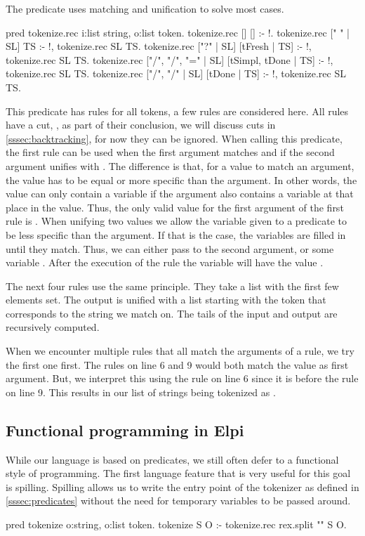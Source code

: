 \documentclass[thesis.tex]{subfiles}
\begin{document}
{{The predicate  uses matching and unification to solve most cases.
\begin{elpicode}
  pred tokenize.rec i:list string, o:list token.
  tokenize.rec [] [] :- !.
  tokenize.rec [" " | SL] TS :- !, tokenize.rec SL TS.
  tokenize.rec ["?" | SL] [tFresh | TS] :- !, 
    tokenize.rec SL TS.
  tokenize.rec ["/", "/", "=" | SL] 
               [tSimpl, tDone | TS] :- !, 
    tokenize.rec SL TS.
  tokenize.rec ["/", "/" | SL] [tDone | TS] :- !, 
    tokenize.rec SL TS.
\end{elpicode}
This predicate has rules for all tokens, a few rules are considered here. All rules have a cut, \elpii{!}, as part of their conclusion, we will discuss cuts in \cref{sssec:backtracking}, for now they can be ignored. When calling this predicate, the first rule can be used when the first argument matches \elpii{[]} and if the second argument unifies with \elpii{[]}. The difference is that, for a value to match an argument, the value has to be equal or more specific than the argument. In other words, the value can only contain a variable if the argument also contains a variable at that place in the value. Thus, the only valid value for the first argument of the first rule is \elpii{[]}. When unifying two values we allow the variable given to a predicate to be less specific than the argument. If that is the case, the variables are filled in until they match. Thus, we can either pass \elpii{[]} to the second argument, or some variable . After the execution of the rule the variable  will have the value \elpii{[]}.

The next four rules use the same principle. They take a list with the first few elements set. The output is unified with a list starting with the token that corresponds to the string we match on. The tails of the input and output are recursively computed.

When we encounter multiple rules that all match the arguments of a rule, we try the first one first. The rules on line 6 and 9 would both match the value \elpii{["/", "/", "="]} as first argument. But, we interpret this using the rule on line 6 since it is before the rule on line 9. This results in our list of strings being tokenized as .

\subsection{Functional programming in Elpi}
While our language is based on predicates, we still often defer to a functional style of programming. The first language feature that is very useful for this goal is spilling. Spilling allows us to write the entry point of the tokenizer as defined in \cref{sssec:predicates} without the need for temporary variables to be passed around.
\begin{elpicode}
  pred tokenize o:string, o:list token.
  tokenize S O :- tokenize.rec {rex.split "" S} O.
\end{elpicode}

}}
\end{document}
